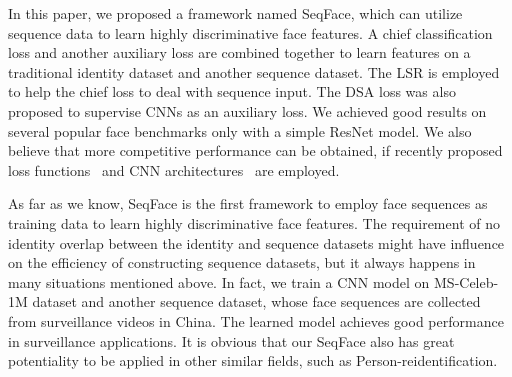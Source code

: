 \documentclass[conference]{acmsiggraph}
\begin{document}
In this paper, we proposed a framework named SeqFace, which can utilize sequence data to learn highly discriminative face features. A chief classification loss and another auxiliary loss are combined together to learn features on a traditional identity dataset and another sequence dataset. The LSR is employed to help the chief loss to deal with sequence input. The DSA loss was also proposed to supervise CNNs as an auxiliary loss. We achieved good results on several popular face benchmarks only with a simple ResNet model. We also believe that more competitive performance can be obtained, if recently proposed loss functions~\cite{cosface,arcface} and CNN architectures~\cite{newresnet} are employed.

As far as we know, SeqFace is the first framework to employ face sequences as training data to learn highly discriminative face features. The requirement of no identity overlap between the identity and sequence datasets might have influence on the efficiency of constructing sequence datasets, but it always happens in many situations mentioned above. In fact, we train a CNN model on MS-Celeb-1M dataset and another sequence dataset, whose face sequences are collected from surveillance videos in China. The learned model achieves good performance in surveillance applications. It is obvious that our SeqFace also has great potentiality to be applied in other similar fields, such as Person-reidentification.
\end{document}
